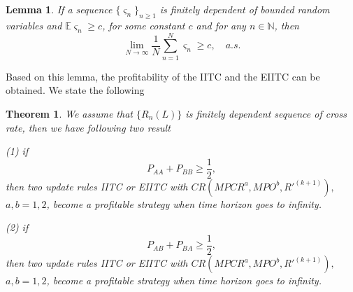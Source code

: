 \documentclass[11pt]{article}
\newtheorem{theorem}{Theorem}[section]
\newtheorem{lemma}{Lemma}[section]
\numberwithin{equation}{section}
\begin{document}
\begin{lemma}\label{lm5.2}
If a sequence $\{\varsigma_n\}_{n\geqslant1}$ is finitely dependent of bounded random variables and $\mathbb{E}\varsigma _n\geqslant c$, for some constant $c$ and for any $n\in \mathbb{N}$, then
\begin{equation}
\lim_{N\rightarrow\infty} \frac{1}{N}\sum_{n=1}^{N} \varsigma_n\geqslant c, \quad a.s.
\end{equation}
\end{lemma}

Based on this lemma, the profitability of the IITC and the EIITC can be obtained. We state the following

\begin{theorem}
We assume that  $\{R_n(L)\}$ is finitely dependent sequence of cross rate, then we have following two result 
 
(1) if
\begin{equation}\label{thmcond1}
P_{AA}+P_{BB}\geq\frac{1}{2},
\end{equation}
then two update rules IITC or EIITC with $ CR(MPCR^a, MPO^b,R'^{(k+1)}),$ $ a,b=1,2$, become a profitable strategy when time horizon goes to infinity.
 
(2)    if
\begin{equation} \label{thmcond2}
P_{AB}+P_{BA}\geq\frac{1}{2},
\end{equation}
then two update rules IITC or EIITC with $ CR(MPCR^a, MPO^b,R'^{(k+1)}),$ $ a,b=1,2$, become a profitable strategy when time horizon goes to infinity.
\end{theorem}
\end{document}
